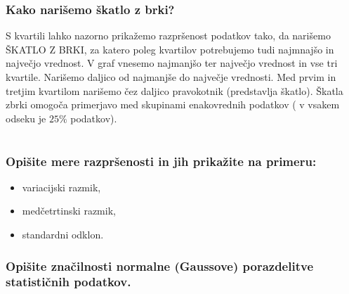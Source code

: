 \documentclass{article}
\begin{document}
\subsubsection*{Kako narišemo škatlo z brki?}

S kvartili lahko nazorno prikažemo razpršenost podatkov tako, da narišemo ŠKATLO Z BRKI, za katero poleg kvartilov potrebujemo tudi najmnajšo in največjo vrednost. V graf vnesemo najmanjšo ter največjo vrednost in vse tri kvartile. Narišemo daljico od najmanjše do največje vrednosti. Med prvim in tretjim kvartilom narišemo čez daljico pravokotnik (predstavlja škatlo). Škatla zbrki omogoča primerjavo med skupinami enakovrednih podatkov ( v vsakem odseku je $25 \%$ podatkov).


\section{\texorpdfstring{}{Statistika}}
\subsubsection*{Opišite mere razpršenosti in jih prikažite na primeru:}

\begin{itemize}
  \item variacijski razmik,
\end{itemize}



\begin{itemize}
  \item medčetrtinski razmik,
\end{itemize}



\begin{itemize}
  \item standardni odklon.
\end{itemize}



\subsubsection*{Opišite značilnosti normalne (Gaussove) porazdelitve statističnih podatkov.}
\end{document}

